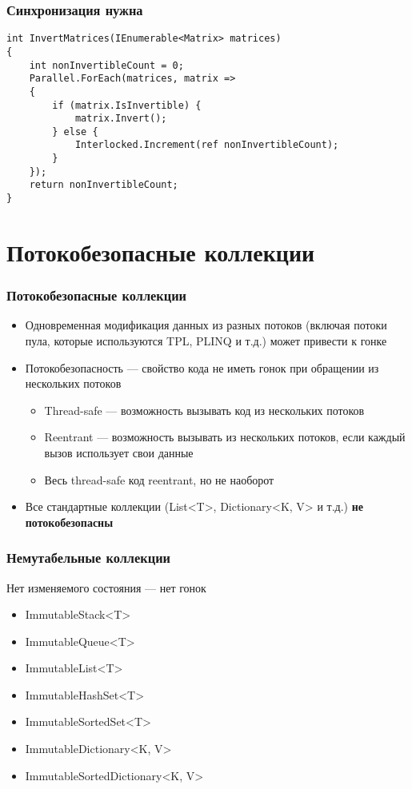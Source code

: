 \documentclass{../../slides-style}
\begin{document}
    \begin{frame}[fragile]
        \frametitle{Синхронизация нужна}
        \begin{footnotesize}
            \begin{verbatim}
int InvertMatrices(IEnumerable<Matrix> matrices)
{
    int nonInvertibleCount = 0;
    Parallel.ForEach(matrices, matrix =>
    {
        if (matrix.IsInvertible) {
            matrix.Invert();
        } else {
            Interlocked.Increment(ref nonInvertibleCount);
        }
    });
    return nonInvertibleCount;
}
            \end{verbatim}
        \end{footnotesize}
    \end{frame}

    \section{Потокобезопасные коллекции}

    \begin{frame}
        \frametitle{Потокобезопасные коллекции}
        \begin{itemize}
            \item Одновременная модификация данных из разных потоков (включая потоки пула, которые используются TPL, PLINQ и т.д.) может привести к гонке
            \item Потокобезопасность --- свойство кода не иметь гонок при обращении из нескольких потоков
            \begin{itemize}
                \item Thread-safe --- возможность вызывать код из нескольких потоков
                \item Reentrant --- возможность вызывать из нескольких потоков, если каждый вызов использует свои данные
                \item Весь thread-safe код reentrant, но не наоборот
            \end{itemize}
            \item Все стандартные коллекции (List<T>, Dictionary<K, V> и т.д.) \textbf{не потокобезопасны}
        \end{itemize}
    \end{frame}

    \begin{frame}
        \frametitle{Немутабельные коллекции}
        Нет изменяемого состояния --- нет гонок
        \begin{itemize}
            \item ImmutableStack<T>
            \item ImmutableQueue<T>
            \item ImmutableList<T>
            \item ImmutableHashSet<T>
            \item ImmutableSortedSet<T>
            \item ImmutableDictionary<K, V>
            \item ImmutableSortedDictionary<K, V>
        \end{itemize}
    \end{frame}
\end{document}
